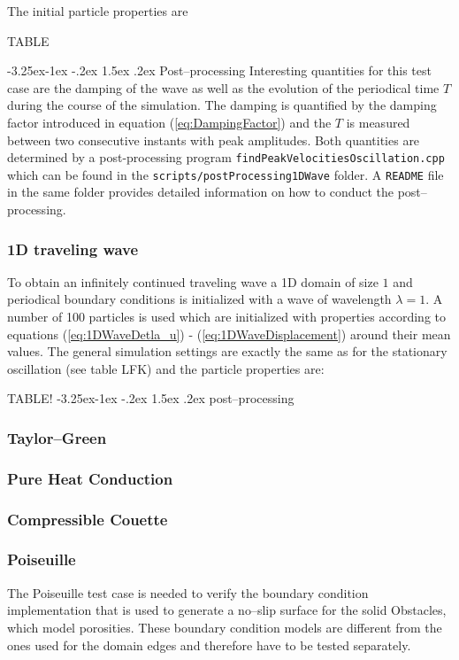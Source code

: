 \documentclass{report}
\makeatletter
\renewcommand\paragraph{\@startsection{paragraph}{4}{\z@}%
  {-3.25ex\@plus -1ex \@minus -.2ex}%
  {1.5ex \@plus .2ex}%
  {\normalfont\normalsize\bfseries}}
\makeatother
\begin{document}
The initial particle properties are


TABLE

\paragraph{Post--processing}
Interesting quantities for this test case are the damping of the wave as well as the evolution of the periodical time $T$ during the course of the simulation. The damping is quantified by the damping factor introduced in equation (\ref{eq:DampingFactor}) and the $T$ is measured between two consecutive instants with peak amplitudes. Both quantities are determined by a post-processing program {\tt findPeakVelocitiesOscillation.cpp} which can be found in the {\tt scripts/postProcessing1DWave} folder. A {\tt README} file in the same folder provides detailed information on how to conduct the post--processing.

\subsubsection{1D traveling wave}
To obtain an infinitely continued traveling wave a 1D domain of size $1$ and periodical boundary conditions is initialized with a wave of wavelength $\lambda=1$. A number of 100 particles is used which are initialized with properties according to equations (\ref{eq:1DWaveDetla_u}) - (\ref{eq:1DWaveDisplacement}) around their mean values.
The general simulation settings are exactly the same as for the stationary oscillation (see table LFK) and the particle properties are:

TABLE!
\paragraph{post--processing}


\subsubsection{Taylor--Green}
\subsubsection{Pure Heat Conduction}
\subsubsection{Compressible Couette}
\subsubsection{Poiseuille}
The Poiseuille test case is needed to verify the boundary condition implementation that is used to generate a no--slip surface for the solid Obstacles, which model porosities. These boundary condition models are different from the ones used for the domain edges and therefore have to be tested separately. 
\end{document}
